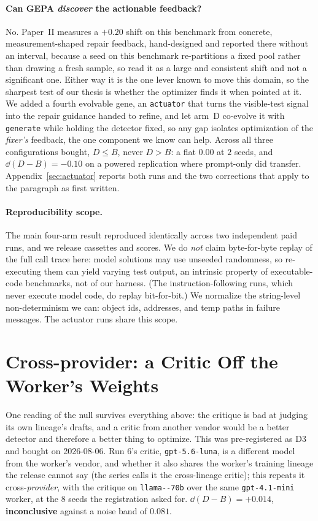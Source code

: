 \documentclass[11pt]{article}
\begin{document}
\paragraph{Can GEPA \emph{discover} the actionable feedback?} No. Paper~II measures a $+0.20$ shift on this benchmark from
concrete, measurement-shaped repair feedback, hand-designed and reported there without an interval,
because a seed on this benchmark re-partitions a fixed pool rather than drawing a fresh sample, so
read it as a large and consistent shift and not a significant one. Either way it is the one lever
known to move this domain, so the sharpest test of our thesis is whether the optimizer finds it when pointed at it. We added a fourth evolvable gene, an \texttt{actuator} that turns the visible-test
signal into the repair guidance handed to refine, and let arm~D co-evolve it with
\texttt{generate} while holding the detector fixed, so any gap isolates optimization of the
\emph{fixer's} feedback, the one component we know can help. Across all three configurations
bought, $D \le B$, never $D > B$: a flat $0.00$ at $2$ seeds, and $\dd(D-B) = -0.10$ on a powered
replication where prompt-only did transfer. Appendix~\ref{sec:actuator} reports both runs and the
two corrections that apply to the paragraph as first written.

\paragraph{Reproducibility scope.} The main four-arm result reproduced identically across two
independent paid runs, and we release cassettes and scores. We do \emph{not} claim
byte-for-byte replay of the full call trace here: model solutions may use unseeded randomness,
so re-executing them can yield varying test output, an intrinsic property of
executable-code benchmarks, not of our harness. (The instruction-following runs, which never
execute model code, do replay bit-for-bit.) We normalize the string-level non-determinism we
can: object ids, addresses, and temp paths in failure messages. The actuator runs share this
scope.

\section{Cross-provider: a Critic Off the Worker's Weights}
\label{sec:xprovider}

One reading of the null survives everything above: the critique is bad at judging its own
lineage's drafts, and a critic from another vendor would be a better detector and therefore a
better thing to optimize. This was pre-registered as D3 and bought on 2026-08-06. Run 6's critic,
\texttt{gpt-5.6-luna}, is a different model from the worker's vendor, and whether it also
shares the worker's training lineage the release cannot say (the series calls it the
cross-lineage critic); this repeats it cross-\emph{provider}, with the
critique on \texttt{llama--\allowbreak 70b} over the same \texttt{gpt-4.1-mini}
worker, at the $8$ seeds the registration asked for. $\dd(D-B) = +0.014$, \textbf{inconclusive}
against a noise band of $0.081$.
\end{document}
